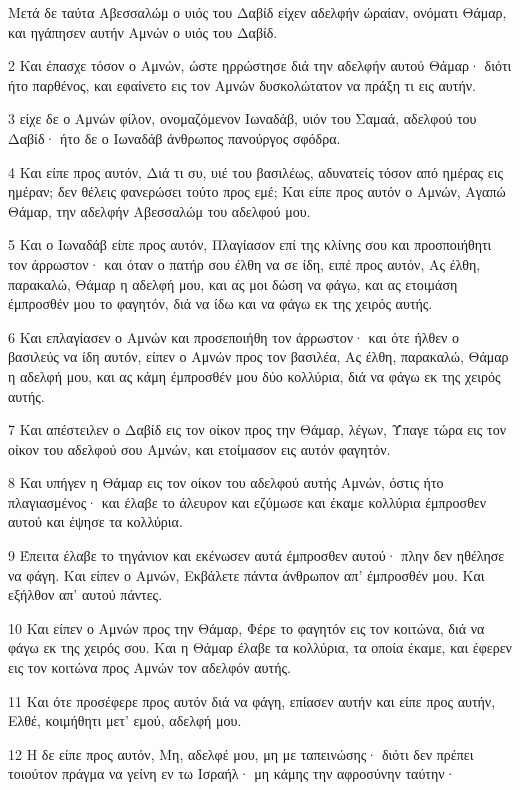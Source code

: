 \par Μετά δε ταύτα Αβεσσαλώμ ο υιός του Δαβίδ είχεν αδελφήν ώραίαν, ονόματι Θάμαρ, και ηγάπησεν αυτήν Αμνών ο υιός του Δαβίδ.
\par 2 Και έπασχε τόσον ο Αμνών, ώστε ηρρώστησε διά την αδελφήν αυτού Θάμαρ· διότι ήτο παρθένος, και εφαίνετο εις τον Αμνών δυσκολώτατον να πράξη τι εις αυτήν.
\par 3 είχε δε ο Αμνών φίλον, ονομαζόμενον Ιωναδάβ, υιόν του Σαμαά, αδελφού του Δαβίδ· ήτο δε ο Ιωναδάβ άνθρωπος πανούργος σφόδρα.
\par 4 Και είπε προς αυτόν, Διά τι συ, υιέ του βασιλέως, αδυνατείς τόσον από ημέρας εις ημέραν; δεν θέλεις φανερώσει τούτο προς εμέ; Και είπε προς αυτόν ο Αμνών, Αγαπώ Θάμαρ, την αδελφήν Αβεσσαλώμ του αδελφού μου.
\par 5 Και ο Ιωναδάβ είπε προς αυτόν, Πλαγίασον επί της κλίνης σου και προσποιήθητι τον άρρωστον· και όταν ο πατήρ σου έλθη να σε ίδη, ειπέ προς αυτόν, Ας έλθη, παρακαλώ, Θάμαρ η αδελφή μου, και ας μοι δώση να φάγω, και ας ετοιμάση έμπροσθέν μου το φαγητόν, διά να ίδω και να φάγω εκ της χειρός αυτής.
\par 6 Και επλαγίασεν ο Αμνών και προσεποιήθη τον άρρωστον· και ότε ήλθεν ο βασιλεύς να ίδη αυτόν, είπεν ο Αμνών προς τον βασιλέα, Ας έλθη, παρακαλώ, Θάμαρ η αδελφή μου, και ας κάμη έμπροσθέν μου δύο κολλύρια, διά να φάγω εκ της χειρός αυτής.
\par 7 Και απέστειλεν ο Δαβίδ εις τον οίκον προς την Θάμαρ, λέγων, Ύπαγε τώρα εις τον οίκον του αδελφού σου Αμνών, και ετοίμασον εις αυτόν φαγητόν.
\par 8 Και υπήγεν η Θάμαρ εις τον οίκον του αδελφού αυτής Αμνών, όστις ήτο πλαγιασμένος· και έλαβε το άλευρον και εζύμωσε και έκαμε κολλύρια έμπροσθεν αυτού και έψησε τα κολλύρια.
\par 9 Έπειτα έλαβε το τηγάνιον και εκένωσεν αυτά έμπροσθεν αυτού· πλην δεν ηθέλησε να φάγη. Και είπεν ο Αμνών, Εκβάλετε πάντα άνθρωπον απ' έμπροσθέν μου. Και εξήλθον απ' αυτού πάντες.
\par 10 Και είπεν ο Αμνών προς την Θάμαρ, Φέρε το φαγητόν εις τον κοιτώνα, διά να φάγω εκ της χειρός σου. Και η Θάμαρ έλαβε τα κολλύρια, τα οποία έκαμε, και έφερεν εις τον κοιτώνα προς Αμνών τον αδελφόν αυτής.
\par 11 Και ότε προσέφερε προς αυτόν διά να φάγη, επίασεν αυτήν και είπε προς αυτήν, Ελθέ, κοιμήθητι μετ' εμού, αδελφή μου.
\par 12 Η δε είπε προς αυτόν, Μη, αδελφέ μου, μη με ταπεινώσης· διότι δεν πρέπει τοιούτον πράγμα να γείνη εν τω Ισραήλ· μη κάμης την αφροσύνην ταύτην·
